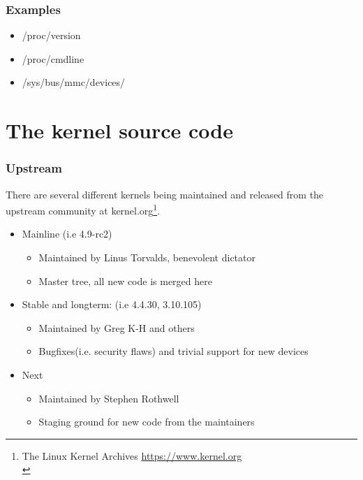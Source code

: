 \documentclass{beamer}
\begin{document}
\begin{frame}
\frametitle{Examples}
\begin{itemize}
	\item /proc/version
	\item /proc/cmdline
	\item /sys/bus/mmc/devices/
\end{itemize}
\end{frame}

\section{The kernel source code}

\begin{frame}
\frametitle{Upstream}

There are several different kernels being maintained and released from the upstream community at kernel.org\footnote{The Linux Kernel Archives \url{https://www.kernel.org}\\}.

\begin{itemize}
	\item Mainline (i.e 4.9-rc2)
	\begin{itemize}
		\item Maintained by Linus Torvalds, benevolent dictator
		\item Master tree, all new code is merged here
	\end{itemize}
	\item Stable and longterm: (i.e 4.4.30, 3.10.105)
	\begin{itemize}
		\item Maintained by Greg K-H and others
		\item Bugfixes(i.e. security flaws) and trivial support for new devices
	\end{itemize}
	\item Next 
	\begin{itemize}	
		\item Maintained by Stephen Rothwell
		\item Staging ground for new code from the maintainers
	\end{itemize}
\end{itemize}
\end{frame}
\end{document}
